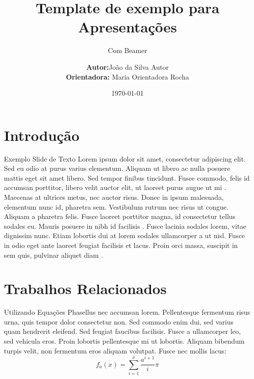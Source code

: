 \documentclass[17pt, c]{beamer}
\title{Template de exemplo para Apresentações}
\subtitle{Com Beamer}
\date{\today}
\institute[DCC]{DCC -- Departamento de Ciência da Computação}
\author[Autor et al]{\textbf{Autor:}João da Silva Autor\\
					 \textbf{Orientadora:} Maria Orientadora Rocha}
\begin{document}
\inserttitlepage


\section{Introdução}
\insertsectionpage

\begin{frame}{Exemplo Slide de Texto}
Lorem ipsum dolor sit amet, consectetur adipiscing elit. Sed eu odio at purus varius elementum. Aliquam ut libero ac nulla posuere mattis eget sit amet libero. Sed tempor finibus tincidunt. Fusce commodo, felis id accumsan porttitor, libero velit auctor elit, ut laoreet purus augue ut mi \cite{Martins2000,NBR6023:2000}.
Maecenas at ultrices metus, nec auctor risus. Donec in ipsum malesuada, elementum nunc id, pharetra sem. Vestibulum rutrum nec risus ut congue. Aliquam a pharetra felis. Fusce laoreet porttitor magna, id consectetur tellus sodales eu. Mauris posuere in nibh id facilisis \cite{Moura1998}.
Fusce lacinia sodales lorem, vitae dignissim nunc. Etiam lobortis dui at lorem sodales ullamcorper a ut nisl. Fusce in odio eget ante laoreet feugiat facilisis et lacus. Proin orci massa, suscipit in sem quis, pulvinar aliquet diam \cite{Silva2005,Lamport1994}.
\end{frame}


\section{Trabalhos Relacionados}
\insertsectionpage
\begin{frame}{Utilizando Equações}
	Phasellus nec accumsan lorem. Pellentesque fermentum risus urna, quis tempor dolor consectetur non. Sed commodo enim dui, sed varius quam hendrerit eleifend. Sed feugiat faucibus facilisis. Fusce a ullamcorper leo, sed vehicula eros. Proin lobortis pellentesque mi ut lobortis. Aliquam bibendum turpis velit, non fermentum eros aliquam volutpat. Fusce nec mollis lacus:
	\begin{equation}
		f_a(x) = \sum_{i = 1}^{x}\frac{a^{i + 1}}{i} \pi
	\end{equation}
\end{frame}
\end{document}
